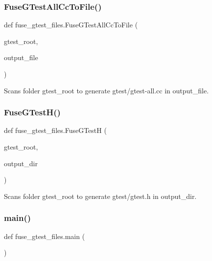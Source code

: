 \subsubsection{\texorpdfstring{FuseGTestAllCcToFile()}{FuseGTestAllCcToFile()}}
{\footnotesize\ttfamily def fuse\+\_\+gtest\+\_\+files.\+Fuse\+G\+Test\+All\+Cc\+To\+File (\begin{DoxyParamCaption}\item[{}]{gtest\+\_\+root,  }\item[{}]{output\+\_\+file }\end{DoxyParamCaption})}

\begin{DoxyVerb}Scans folder gtest_root to generate gtest/gtest-all.cc in output_file.\end{DoxyVerb}
 \mbox{\label{namespacefuse__gtest__files_a95685ab66129ced9d7b3db78e6001c8b}} 
\subsubsection{\texorpdfstring{FuseGTestH()}{FuseGTestH()}}
{\footnotesize\ttfamily def fuse\+\_\+gtest\+\_\+files.\+Fuse\+G\+TestH (\begin{DoxyParamCaption}\item[{}]{gtest\+\_\+root,  }\item[{}]{output\+\_\+dir }\end{DoxyParamCaption})}

\begin{DoxyVerb}Scans folder gtest_root to generate gtest/gtest.h in output_dir.\end{DoxyVerb}
 \mbox{\label{namespacefuse__gtest__files_a5eaf924c10970f574e1b0459cbbda75a}} 
\subsubsection{\texorpdfstring{main()}{main()}}
{\footnotesize\ttfamily def fuse\+\_\+gtest\+\_\+files.\+main (\begin{DoxyParamCaption}{ }\end{DoxyParamCaption})}

